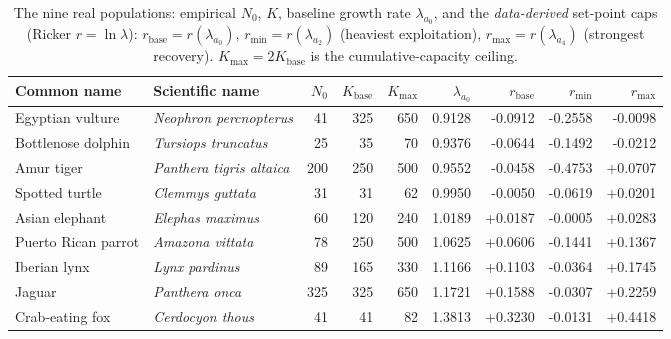\documentclass[11pt]{article}
\newcommand{\rbase}{r_{\mathrm{base}}}
\newcommand{\Kbase}{K_{\mathrm{base}}}
\newcommand{\rmax}{r_{\max}}
\newcommand{\rmin}{r_{\min}}
\newcommand{\Kmax}{K_{\max}}
\begin{document}
\begin{table}[h]\centering\footnotesize
\caption{The nine real populations: empirical $N_0$, $K$, baseline growth rate
$\lambda_{a_0}$, and the \emph{data-derived} set-point caps (Ricker
$r=\ln\lambda$): $\rbase{=}r(\lambda_{a_0})$, $\rmin{=}r(\lambda_{a_2})$ (heaviest
exploitation), $\rmax{=}r(\lambda_{a_4})$ (strongest recovery). $\Kmax{=}2\Kbase$
is the cumulative-capacity ceiling.}
\label{tab:pops}
\begin{tabular}{@{}l l r r r r r r r@{}}
\toprule
Common name & Scientific name & $N_0$ & $\Kbase$ & $\Kmax$ & $\lambda_{a_0}$ & $\rbase$ & $\rmin$ & $\rmax$ \\
\midrule

Egyptian vulture & \emph{Neophron percnopterus} & 41 & 325 & 650 & 0.9128 & -0.0912 & -0.2558 & -0.0098 \\
Bottlenose dolphin & \emph{Tursiops truncatus} & 25 & 35 & 70 & 0.9376 & -0.0644 & -0.1492 & -0.0212 \\
Amur tiger & \emph{Panthera tigris altaica} & 200 & 250 & 500 & 0.9552 & -0.0458 & -0.4753 & +0.0707 \\
Spotted turtle & \emph{Clemmys guttata} & 31 & 31 & 62 & 0.9950 & -0.0050 & -0.0619 & +0.0201 \\
Asian elephant & \emph{Elephas maximus} & 60 & 120 & 240 & 1.0189 & +0.0187 & -0.0005 & +0.0283 \\
Puerto Rican parrot & \emph{Amazona vittata} & 78 & 250 & 500 & 1.0625 & +0.0606 & -0.1441 & +0.1367 \\
Iberian lynx & \emph{Lynx pardinus} & 89 & 165 & 330 & 1.1166 & +0.1103 & -0.0364 & +0.1745 \\
Jaguar & \emph{Panthera onca} & 325 & 325 & 650 & 1.1721 & +0.1588 & -0.0307 & +0.2259 \\
Crab-eating fox & \emph{Cerdocyon thous} & 41 & 41 & 82 & 1.3813 & +0.3230 & -0.0131 & +0.4418 \\
\bottomrule
\end{tabular}
\end{table}
\end{document}

